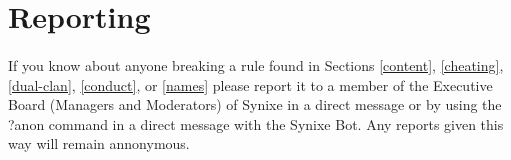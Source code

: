\documentclass[10pt,a4paper]{article}
\begin{document}
\section{Reporting}
\paragraph{}
If you know about anyone breaking a rule found in Sections \ref{content}, \ref{cheating}, \ref{dual-clan}, \ref{conduct}, or \ref{names} please report it to a member of the Executive Board (Managers and Moderators) of Synixe in a direct message or by using the ?anon command in a direct message with the Synixe Bot. Any reports given this way will remain annonymous.
\end{document}
